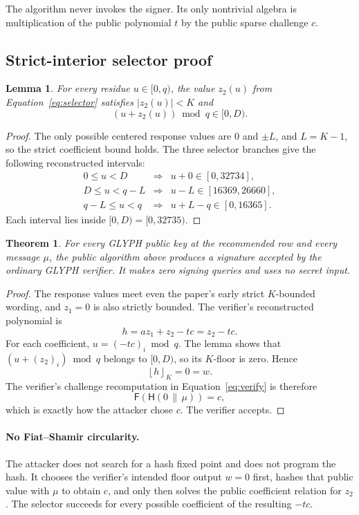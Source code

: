 \documentclass[10pt,a4paper]{article}
\newtheorem{theorem}{Theorem}
\newtheorem{lemma}{Lemma}
\newcommand{\Kfloor}[1]{\left\lfloor #1\right\rfloor_K}
\newcommand{\Hash}{\mathsf{H}}
\newcommand{\Encode}{\mathsf{F}}
\begin{document}
The algorithm never invokes the signer.  Its only nontrivial algebra is
multiplication of the public polynomial $t$ by the public sparse challenge
$c$.

\subsection{Strict-interior selector proof}

\begin{lemma}
For every residue $u\in[0,q)$, the value $z_2(u)$ from
Equation~\eqref{eq:selector} satisfies $|z_2(u)|<K$ and
\[
  (u+z_2(u))\bmod q\in[0,D).
\]
\end{lemma}

\begin{proof}
The only possible centered response values are $0$ and $\pm L$, and
$L=K-1$, so the strict coefficient bound holds.  The three selector branches
give the following reconstructed intervals:
\[
\begin{array}{ccl}
0\le u<D
  &\Longrightarrow& u+0\in[0,32734],\\[2pt]
D\le u<q-L
  &\Longrightarrow& u-L\in[16369,26660],\\[2pt]
q-L\le u<q
  &\Longrightarrow& u+L-q\in[0,16365].
\end{array}
\]
Each interval lies inside $[0,D)=[0,32735)$.
\end{proof}

\begin{theorem}
For every GLYPH public key at the recommended row and every message $\mu$,
the public algorithm above produces a signature accepted by the ordinary
GLYPH verifier.  It makes zero signing queries and uses no secret input.
\end{theorem}

\begin{proof}
The response values meet even the paper's early strict $K$-bounded wording,
and $z_1=0$ is also strictly bounded.  The verifier's reconstructed
polynomial is
\[
  h=az_1+z_2-tc=z_2-tc.
\]
For each coefficient, $u=(-tc)_i\bmod q$.  The lemma shows that
$(u+(z_2)_i)\bmod q$ belongs to $[0,D)$, so its $K$-floor is zero.  Hence
\[
  \Kfloor{h}=0=w.
\]
The verifier's challenge recomputation in Equation~\eqref{eq:verify} is
therefore
\[
  \Encode\!\left(\Hash(0\,\|\,\mu)\right)=c,
\]
which is exactly how the attacker chose $c$.  The verifier accepts.
\end{proof}

\paragraph{No Fiat--Shamir circularity.}
The attacker does not search for a hash fixed point and does not program the
hash.  It chooses the verifier's intended floor output $w=0$ first, hashes
that public value with $\mu$ to obtain $c$, and only then solves the public
coefficient relation for $z_2$.  The selector succeeds for every possible
coefficient of the resulting $-tc$.
\end{document}
